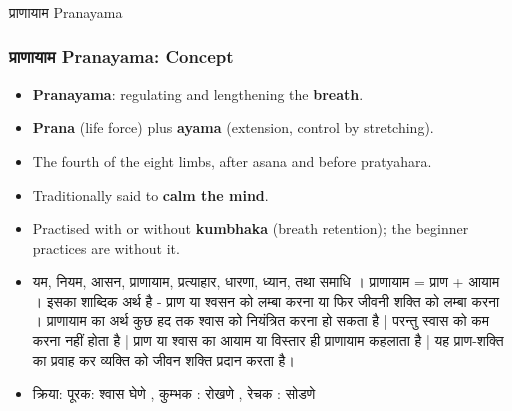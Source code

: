 \begin{frame}[fragile]\frametitle{}
\begin{center}
{\Large प्राणायाम Pranayama}
\end{center}
\end{frame}

\begin{frame}[fragile]\frametitle{प्राणायाम Pranayama: Concept}

      \begin{itemize}
        \item \textbf{Pranayama}: regulating and lengthening the \textbf{breath}.
        \item \textbf{Prana} (life force) plus \textbf{ayama} (extension, control by stretching).
        \item The fourth of the eight limbs, after asana and before pratyahara.
        \item Traditionally said to \textbf{calm the mind}.
        \item Practised with or without \textbf{kumbhaka} (breath retention); the beginner practices are without it.
		\item  यम, नियम, आसन, प्राणायाम, प्रत्याहार, धारणा, ध्यान, तथा समाधि । प्राणायाम = प्राण + आयाम । इसका शाब्दिक अर्थ है -  प्राण या श्वसन को लम्बा करना  या फिर   जीवनी शक्ति  को लम्बा करना । प्राणायाम का अर्थ कुछ हद तक श्वास को नियंत्रित करना हो सकता है | परन्तु स्वास को कम करना नहीं होता है | प्राण या श्वास का आयाम या विस्तार ही प्राणायाम कहलाता है | यह प्राण-शक्ति का प्रवाह कर व्यक्ति को जीवन शक्ति प्रदान करता है।
		\item क्रिया: पूरक: श्वास घेणे , कुम्भक : रोखणे , रेचक : सोडणे 

      \end{itemize}

\end{frame}


